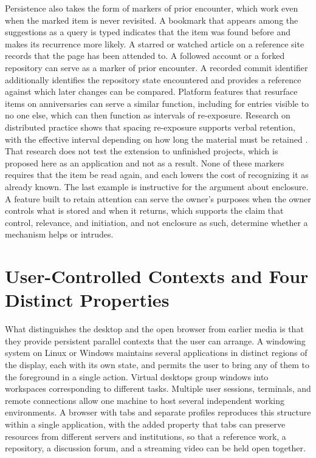 \documentclass[12pt]{article}
\begin{document}
Persistence also takes the form of markers of prior encounter, which work even when the marked item is never revisited. A bookmark that appears among the suggestions as a query is typed indicates that the item was found before and makes its recurrence more likely. A starred or watched article on a reference site records that the page has been attended to. A followed account or a forked repository can serve as a marker of prior encounter. A recorded commit identifier additionally identifies the repository state encountered and provides a reference against which later changes can be compared. Platform features that resurface items on anniversaries can serve a similar function, including for entries visible to no one else, which can then function as intervals of re-exposure. Research on distributed practice shows that spacing re-exposure supports verbal retention, with the effective interval depending on how long the material must be retained \cite{cepeda2006distributed}. That research does not test the extension to unfinished projects, which is proposed here as an application and not as a result. None of these markers requires that the item be read again, and each lowers the cost of recognizing it as already known. The last example is instructive for the argument about enclosure. A feature built to retain attention can serve the owner's purposes when the owner controls what is stored and when it returns, which supports the claim that control, relevance, and initiation, and not enclosure as such, determine whether a mechanism helps or intrudes.

\section{User-Controlled Contexts and Four Distinct Properties}

What distinguishes the desktop and the open browser from earlier media is that they provide persistent parallel contexts that the user can arrange. A windowing system on Linux or Windows maintains several applications in distinct regions of the display, each with its own state, and permits the user to bring any of them to the foreground in a single action. Virtual desktops group windows into workspaces corresponding to different tasks. Multiple user sessions, terminals, and remote connections allow one machine to host several independent working environments. A browser with tabs and separate profiles reproduces this structure within a single application, with the added property that tabs can preserve resources from different servers and institutions, so that a reference work, a repository, a discussion forum, and a streaming video can be held open together.
\end{document}
